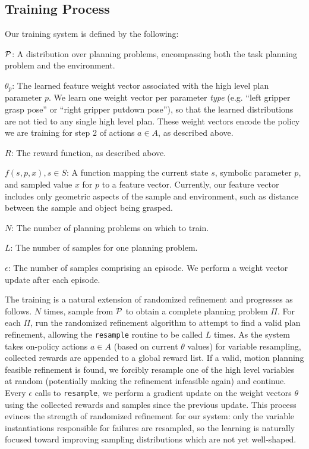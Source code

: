 \subsection{Training Process}
Our training system is defined by the following:
\begin{tightlist}
\item[$\mathcal{P}$:] A distribution over planning problems, encompassing both
the task planning problem and the environment.
\item[$\theta_{p}$:] The learned feature weight vector associated with the high
level plan parameter $p$. We learn one
weight vector per parameter \emph{type} (e.g. ``left gripper grasp pose'' or ``right
gripper putdown pose''), so that the learned distributions are
not tied to any single high level plan. These weight vectors encode the policy
we are training for step 2 of actions $a \in A$, as described above.
\item[$R$:] The reward function, as described above.
\item[$f(s, p, x), s \in S$:] A function mapping the current state $s$, symbolic
parameter $p$, and sampled value $x$ for $p$ to a feature vector. Currently, our feature vector includes
only geometric aspects of the sample and environment, such as distance between the sample and object being grasped.
\item[$N$:] The number of planning problems on which to train.
\item[$L$:] The number of samples for one planning problem.
\item[$\epsilon$:] The number of samples comprising an episode. We perform
a weight vector update after each episode.
\end{tightlist}

The training is a natural extension of randomized
refinement and progresses as follows. $N$ times, sample from $\mathcal{P}$ to obtain
a complete planning problem $\Pi$. For each $\Pi$, run the randomized refinement
algorithm to attempt to find a valid plan refinement, allowing the \texttt{resample}
routine to be called $L$ times. As the system takes on-policy actions $a \in A$ (based on
current $\theta$ values) for variable resampling, collected
rewards are appended to a global reward list. If a valid, motion planning
feasible refinement is found, we forcibly resample one of
the high level variables at random (potentially making the refinement infeasible again)
and continue. Every $\epsilon$ calls to
\texttt{resample}, we perform a gradient update on the weight vectors $\theta$ using the
collected rewards and samples since the previous update. This process
evinces the strength of randomized refinement for our system: only the variable
instantiations responsible for failures are resampled, so the learning is naturally
focused toward improving sampling distributions which are not yet well-shaped.

